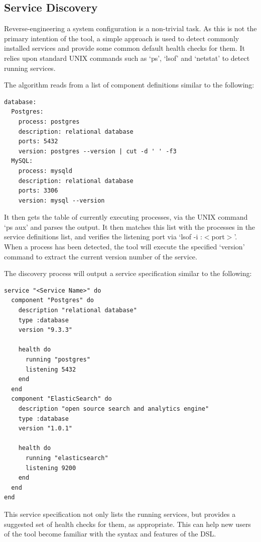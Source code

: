 \documentclass{cshonours}
\begin{document}
\pagebreak
\subsection{Service Discovery}

Reverse-engineering a system configuration is a non-trivial task. As this is not the primary intention of the tool, a simple approach is used to detect commonly installed services and provide some common default health checks for them. It relies upon standard UNIX commands such as `ps', `lsof' and `netstat' to detect running services.

The algorithm reads from a list of component definitions similar to the following:

\begin{verbatim}
database:
  Postgres:
    process: postgres
    description: relational database
    ports: 5432
    version: postgres --version | cut -d ' ' -f3
  MySQL:
    process: mysqld
    description: relational database
    ports: 3306
    version: mysql --version
\end{verbatim}

It then gets the table of currently executing processes, via the UNIX command `ps aux' and parses the output. It then matches this list with the processes in the service definitions list, and verifies the listening port via `lsof -i :$<$port$>$'. When a process has been detected, the tool will execute the specified `version' command to extract the current version number of the service.

\pagebreak
The discovery process will output a service specification similar to the following:

\begin{verbatim}
service "<Service Name>" do
  component "Postgres" do
    description "relational database"
    type :database
    version "9.3.3"

    health do
      running "postgres"
      listening 5432
    end
  end
  component "ElasticSearch" do
    description "open source search and analytics engine"
    type :database
    version "1.0.1"

    health do
      running "elasticsearch"
      listening 9200
    end
  end
end
\end{verbatim}

This service specification not only lists the running services, but provides a suggested set of health checks for them, as appropriate. This can help new users of the tool become familiar with the syntax and features of the DSL.
\end{document}
